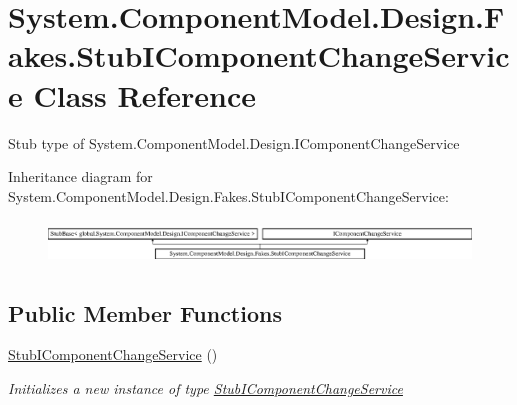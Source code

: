 \hypertarget{class_system_1_1_component_model_1_1_design_1_1_fakes_1_1_stub_i_component_change_service}{\section{System.\-Component\-Model.\-Design.\-Fakes.\-Stub\-I\-Component\-Change\-Service Class Reference}
\label{class_system_1_1_component_model_1_1_design_1_1_fakes_1_1_stub_i_component_change_service}
}


Stub type of System.\-Component\-Model.\-Design.\-I\-Component\-Change\-Service 


Inheritance diagram for System.\-Component\-Model.\-Design.\-Fakes.\-Stub\-I\-Component\-Change\-Service\-:\begin{figure}[H]
\begin{center}
\leavevmode
\includegraphics[height=1.171548cm]{class_system_1_1_component_model_1_1_design_1_1_fakes_1_1_stub_i_component_change_service}
\end{center}
\end{figure}
\subsection*{Public Member Functions}
\begin{DoxyCompactItemize}
\item 
\hyperlink{class_system_1_1_component_model_1_1_design_1_1_fakes_1_1_stub_i_component_change_service_a3429d4d5fef7efbe29cf3f93504bab4a}{Stub\-I\-Component\-Change\-Service} ()
\begin{DoxyCompactList}\small\item\em Initializes a new instance of type \hyperlink{class_system_1_1_component_model_1_1_design_1_1_fakes_1_1_stub_i_component_change_service}{Stub\-I\-Component\-Change\-Service}\end{DoxyCompactList}\end{DoxyCompactItemize}
